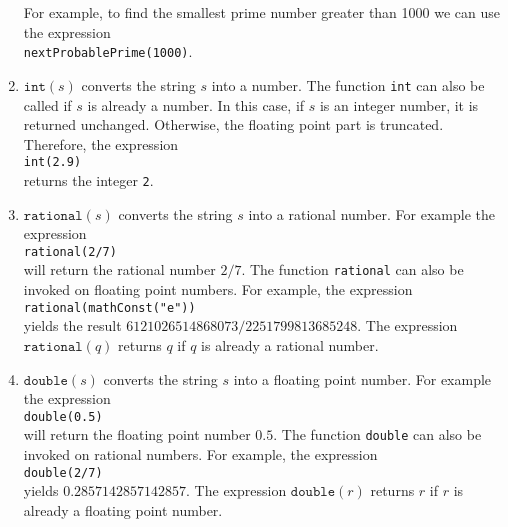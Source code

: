 \begin{enumerate}
      For example, to find the smallest prime number greater than 1000 we can use the expression
      \\[0.2cm]
      \hspace*{1.3cm}
      \texttt{nextProbablePrime(1000)}.
\item $\texttt{int}(s)$ converts the string $s$ into a number.
      The function \texttt{int} can also be called if $s$ is already a
      number.  In this case,  if $s$ is an integer number, it is returned unchanged.  Otherwise,
      the floating point part is truncated.  Therefore, the expression
      \\[0.2cm]
      \hspace*{1.3cm}
      \texttt{int(2.9)}
      \\[0.2cm]
      returns the integer \texttt{2}.
\item $\mathtt{rational}(s)$ converts the string $s$ into a rational number.  For example
      the expression
      \\[0.2cm]
      \hspace*{1.3cm}
      \texttt{rational(2/7)}
      \\[0.2cm]
      will return the rational number $2/7$.  The function \texttt{rational} can also be
      invoked on floating point numbers.  For example, the expression 
      \\[0.2cm]
      \hspace*{1.3cm}
      \texttt{rational(mathConst("e"))}
      \\[0.2cm]
      yields the result $6121026514868073/2251799813685248$.  
      The expression $\mathtt{rational}(q)$ returns $q$ if $q$ is already a rational number.
\item $\texttt{double}(s)$ converts the string $s$ into a floating point number.  For example
      the expression
      \\[0.2cm]
      \hspace*{1.3cm}
      \texttt{double(0.5)}
      \\[0.2cm]
      will return the floating point number $0.5$.  The function \texttt{double} can also be
      invoked on rational numbers.  For example, the expression 
      \\[0.2cm]
      \hspace*{1.3cm}
      \texttt{double(2/7)}
      \\[0.2cm]
      yields  $0.2857142857142857$.
      The expression $\mathtt{double}(r)$ returns $r$ if $r$ is already a floating point
      number.


\end{enumerate}
